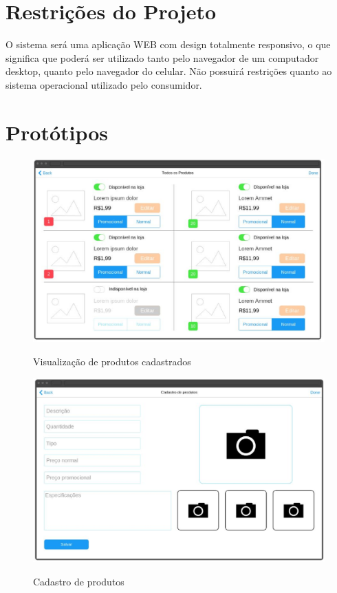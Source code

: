 \documentclass[a4paper,12pt]{monografia}
\begin{document}

\section{Restrições do Projeto} %
\label{sec:restricoes_do_projeto}

O sistema será uma aplicação WEB com design totalmente responsivo, o que significa que poderá ser utilizado tanto pelo navegador de um computador desktop, quanto pelo navegador do celular. Não possuirá restrições quanto ao sistema operacional utilizado pelo consumidor.


\section{Protótipos} %
\label{sec:prototipos}

\begin{figure}[H]
\centering
\caption{Visualização de produtos cadastrados}
\centering
\includegraphics[width=12cm]{img/prototipos/produtos-cadastrados.eps}\\
\label{figura:produtos_cadastrados}
\end{figure}

\begin{figure}[H]
\centering
\caption{Cadastro de produtos}
\centering
\includegraphics[width=12cm]{img/prototipos/cadastro-produto.eps}\\
\label{figura:Cadastro_de_Produtos}
\end{figure}
\end{document}
